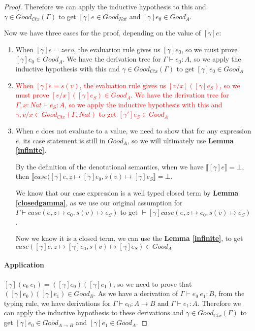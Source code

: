 \begin{proof}
 Therefore we can apply the inductive hypothesis to this and $\gamma \in Good_{Ctx}(\Gamma)$ to get $[\gamma]e \in Good_{Nat}$ and $[\gamma]e_0 \in Good_A$. 
 
 
Now we have three cases for the proof, depending on the value of $[\gamma]e$:

\begin{enumerate}
\item{When $[\gamma]e = zero$, the evaluation rule gives us $[\gamma]e_0$, so we must prove $[\gamma]e_0 \in Good_A$. We have the derivation tree for $\Gamma \vdash e_0 : A$, so we apply the inductive hypothesis with this and $\gamma \in Good_{Ctx}(\Gamma)$ to get $[\gamma]e_0 \in Good_A$}
\item{ \textcolor{red}{When $[\gamma]e = s(v)$, the evaluation rule gives us $[v/x]([\gamma]e_S)$, so we must prove $[v/x]([\gamma]e_S) \in Good_A$. We have the derivation tree for $\Gamma, x : Nat \vdash e_S : A$, so we apply the inductive hypothesis with this and $\gamma, v/x \in Good_{Ctx}(\Gamma, Nat)$ to get $[\gamma']e_S \in Good_A$}}
\item{When $e$ does not evaluate to a value, we need to show that for any expression $e$, its case statement is still in $Good_A$, so we will ultimately use \textbf{Lemma \ref{infinite}}.

By the definition of the denotational semantics, when we have $\llbracket [\gamma]e \rrbracket = \bot$, then $\llbracket case([\gamma]e, z \mapsto [\gamma]e_0, s(v) \mapsto [\gamma]e_S \rrbracket = \bot$.

We know that our case expression is a well typed closed term by \textbf{Lemma \ref{closedgamma}}, as we use our original assumption for $\Gamma \vdash case(e, z \mapsto e_0, s(v) \mapsto e_S)$ to get $\vdash [\gamma]case(e, z \mapsto e_0, s(v) \mapsto e_S)$.

Now we know it is a closed term,  we can use the \textbf{Lemma \ref{infinite}}, to get $case([\gamma]e, z \mapsto [\gamma]e_0, s(v) \mapsto [\gamma]e_S) \in Good_A$
}
\end{enumerate}

\paragraph{Application} $[\gamma](e_0 \ e_1) = ([\gamma] e_0) ([\gamma] e_1)$, so we need to prove that $([\gamma] e_0) ([\gamma] e_1) \in Good_B$. As we have a derivation of $\Gamma \vdash e_0 \ e_1 : B$, from the typing rule, we have derivations for $\Gamma \vdash e_0 : A \to B$ and $\Gamma \vdash e_1 : A$. Therefore we can apply the inductive hypothesis to these derivations and $\gamma \in Good_{Ctx}(\Gamma)$ to get $[\gamma]e_0 \in Good_{A \to B}$ and $[\gamma]e_1 \in Good_A$. 


\end{proof}
